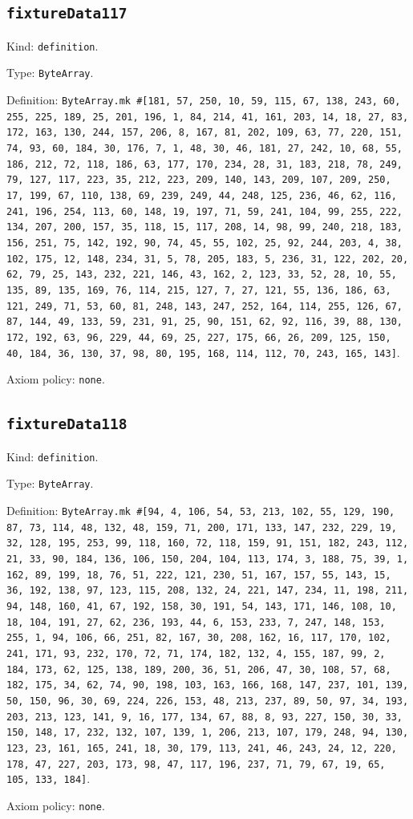 \documentclass[11pt]{article}
\begin{document}
\subsection*{\texttt{fixtureData117}}
\noindent Kind: \texttt{definition}.\par
\noindent Type: \texttt{ByteArray}.\par
\noindent Definition: \texttt{ByteArray.mk \#[181, 57, 250, 10, 59, 115, 67, 138, 243, 60, 255, 225, 189, 25, 201, 196, 1, 84, 214, 41, 161, 203, 14, 18, 27, 83, 172, 163, 130, 244, 157, 206, 8, 167, 81, 202, 109, 63, 77, 220, 151, 74, 93, 60, 184, 30, 176, 7, 1, 48, 30, 46, 181, 27, 242, 10, 68, 55, 186, 212, 72, 118, 186, 63, 177, 170, 234, 28, 31, 183, 218, 78, 249, 79, 127, 117, 223, 35, 212, 223, 209, 140, 143, 209, 107, 209, 250, 17, 199, 67, 110, 138, 69, 239, 249, 44, 248, 125, 236, 46, 62, 116, 241, 196, 254, 113, 60, 148, 19, 197, 71, 59, 241, 104, 99, 255, 222, 134, 207, 200, 157, 35, 118, 15, 117, 208, 14, 98, 99, 240, 218, 183, 156, 251, 75, 142, 192, 90, 74, 45, 55, 102, 25, 92, 244, 203, 4, 38, 102, 175, 12, 148, 234, 31, 5, 78, 205, 183, 5, 236, 31, 122, 202, 20, 62, 79, 25, 143, 232, 221, 146, 43, 162, 2, 123, 33, 52, 28, 10, 55, 135, 89, 135, 169, 76, 114, 215, 127, 7, 27, 121, 55, 136, 186, 63, 121, 249, 71, 53, 60, 81, 248, 143, 247, 252, 164, 114, 255, 126, 67, 87, 144, 49, 133, 59, 231, 91, 25, 90, 151, 62, 92, 116, 39, 88, 130, 172, 192, 63, 96, 229, 44, 69, 25, 227, 175, 66, 26, 209, 125, 150, 40, 184, 36, 130, 37, 98, 80, 195, 168, 114, 112, 70, 243, 165, 143]}.\par
\noindent Axiom policy: \texttt{none}.\par
\subsection*{\texttt{fixtureData118}}
\noindent Kind: \texttt{definition}.\par
\noindent Type: \texttt{ByteArray}.\par
\noindent Definition: \texttt{ByteArray.mk \#[94, 4, 106, 54, 53, 213, 102, 55, 129, 190, 87, 73, 114, 48, 132, 48, 159, 71, 200, 171, 133, 147, 232, 229, 19, 32, 128, 195, 253, 99, 118, 160, 72, 118, 159, 91, 151, 182, 243, 112, 21, 33, 90, 184, 136, 106, 150, 204, 104, 113, 174, 3, 188, 75, 39, 1, 162, 89, 199, 18, 76, 51, 222, 121, 230, 51, 167, 157, 55, 143, 15, 36, 192, 138, 97, 123, 115, 208, 132, 24, 221, 147, 234, 11, 198, 211, 94, 148, 160, 41, 67, 192, 158, 30, 191, 54, 143, 171, 146, 108, 10, 18, 104, 191, 27, 62, 236, 193, 44, 6, 153, 233, 7, 247, 148, 153, 255, 1, 94, 106, 66, 251, 82, 167, 30, 208, 162, 16, 117, 170, 102, 241, 171, 93, 232, 170, 72, 71, 174, 182, 132, 4, 155, 187, 99, 2, 184, 173, 62, 125, 138, 189, 200, 36, 51, 206, 47, 30, 108, 57, 68, 182, 175, 34, 62, 74, 90, 198, 103, 163, 166, 168, 147, 237, 101, 139, 50, 150, 96, 30, 69, 224, 226, 153, 48, 213, 237, 89, 50, 97, 34, 193, 203, 213, 123, 141, 9, 16, 177, 134, 67, 88, 8, 93, 227, 150, 30, 33, 150, 148, 17, 232, 132, 107, 139, 1, 206, 213, 107, 179, 248, 94, 130, 123, 23, 161, 165, 241, 18, 30, 179, 113, 241, 46, 243, 24, 12, 220, 178, 47, 227, 203, 173, 98, 47, 117, 196, 237, 71, 79, 67, 19, 65, 105, 133, 184]}.\par
\noindent Axiom policy: \texttt{none}.\par
\end{document}
